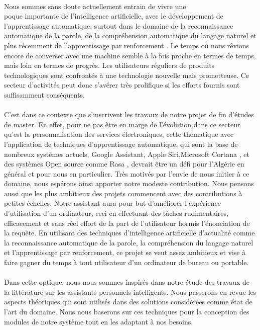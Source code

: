 \paragraph{}
Nous sommes sans doute actuellement entrain de vivre une \\
poque importante de l'intelligence artificielle, avec le développement de l'apprentissage automatique, surtout dans le domaine de la reconnaissance automatique de la parole, de la compréhension automatique du langage naturel et plus récemment de l'apprentissage par renforcement \citep{SPA-overview}. Le temps où nous rêvions encore de converser avec une machine semble à la fois proche en termes de temps, mais loin en termes de progrès. Les utilisateurs réguliers de produits technologiques sont confrontés à une technologie nouvelle mais prometteuse. Ce secteur d'activités peut donc s'avérer très prolifique si les efforts fournis sont suffisamment conséquents.

\paragraph{}
C'est dans ce contexte que s'inscrivent les travaux de notre projet de fin d'études de master. En effet, pour ne pas être en marge de l'évolution dans ce secteur qu'est la personnalisation des services électroniques, cette thématique avec l'application de techniques d'apprentissage automatique, qui sont la base de nombreux systèmes actuels, Google Assistant, Apple Siri,Microsoft Cortana \citep{spas_battle_royal}, et des systèmes Open source comme Rasa \citep{rasa_nlu}, devrait être un défi  pour l'Algérie en général et  pour nous en particulier. Très motivés par l'envie de nous initier à ce domaine, nous espérons ainsi apporter notre modeste contribution. Nous pensons aussi que les plus ambitieux des projets commencent avec des contributions à petites échelles. Notre assistant aura pour but d'améliorer l'expérience d'utilisation d'un ordinateur, ceci en effectuant des tâches rudimentaires, efficacement et sans réel effort de la part de l'utilisateur hormis l'énonciation de la requête. En utilisant des techniques d'intelligence artificielle d'actualité comme la reconnaissance automatique de la parole, la compréhension du langage naturel et l'apprentissage par renforcement, ce projet se veut assez ambitieux et vise à faire gagner du temps à tout utilisateur d'un ordinateur de bureau ou portable.
	
\paragraph{}
Dans cette optique, nous nous sommes inspirés dans notre étude des travaux de la littérature sur les assistants personnels intelligents. Nous passerons en revue les aspects théoriques qui sont utilisés dans des solutions considérées comme état de l'art du domaine. Nous nous baserons sur ces techniques pour la conception des modules de notre système tout en les adaptant à nos besoins. 

